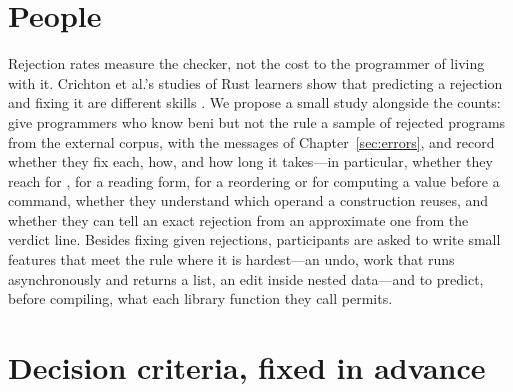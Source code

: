 \section{People}
\label{sec:eval-people}

Rejection rates measure the checker, not the cost to the programmer of living with it. Crichton et al.'s
studies of Rust learners show that predicting a rejection and fixing it are different skills
\citep{crichton2023grounded}. We propose a small study alongside the counts: give programmers who know
beni but not the rule a sample of rejected programs from the external corpus, with the messages of
Chapter~\ref{sec:errors}, and record whether they fix each, how, and how long it takes---in particular,
whether they reach for , for a reading form, for a reordering or for computing a value
before a command, whether they understand which operand a construction reuses, and whether they can tell
an exact rejection from an approximate one from the verdict line. Besides fixing given rejections,
participants are asked to write small features that meet the rule where it is hardest---an undo, work
that runs asynchronously and returns a list, an edit inside nested data---and to predict, before compiling,
what each library function they call permits.

\section{Decision criteria, fixed in advance}
\label{sec:eval-decisions}

